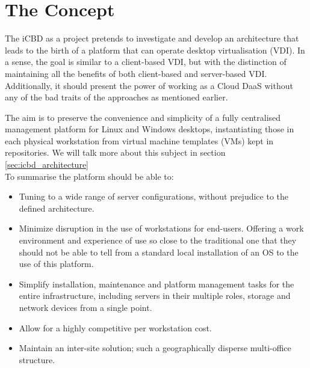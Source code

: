 \section{The Concept} %
\label{sec:icbd_concept}

The iCBD as a project pretends to investigate and develop an architecture that leads to the birth of a platform that can operate desktop virtualisation (\gls{VDI}). In a sense, the goal is similar to a client-based VDI, but with the distinction of maintaining all the benefits of both client-based and server-based VDI. Additionally, it should present the power of working as a Cloud \gls{DaaS} without any of the bad traits of the approaches as mentioned earlier.

The aim is to preserve the convenience and simplicity of a fully centralised management platform for Linux and Windows desktops, instantiating those in each physical workstation from virtual machine templates (VMs) kept in repositories. We will talk more about this subject in section \ref{sec:icbd_architecture}\\

To summarise the platform should be able to:

\begin{itemize}
	\item Tuning to a wide range of server configurations, without prejudice to the defined architecture.
	\item Minimize disruption in the use of workstations for end-users. Offering a work environment and experience of use so close to the traditional one that they should not be able to tell from a standard local installation of an \gls{OS} to the use of this platform.
	\item Simplify installation, maintenance and platform management tasks for the entire infrastructure, including servers in their multiple roles, storage and network devices from a single point.
	\item Allow for a highly competitive per workstation cost.
	\item Maintain an inter-site solution; such a geographically disperse multi-office structure.
\end{itemize}


